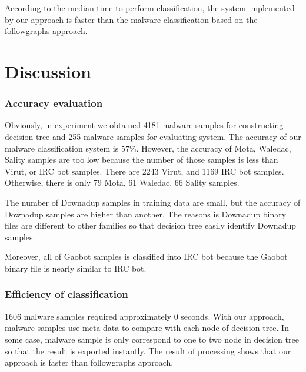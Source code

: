 According to the median time to perform classification, the system implemented by our approach is faster than the malware classification based on the followgraphs approach.
\section{Discussion}
\subsubsection{Accuracy evaluation}
Obviously, in experiment we obtained 4181 malware samples for constructing decision tree and 255 malware samples for evaluating system. The accuracy of our malware classification system is 57\%. However, the accuracy of Mota, Waledac, Sality samples are too low because the number of those samples is less than Virut, or IRC bot samples. There are 2243 Virut, and 1169 IRC bot samples. Otherwise, there is only 79 Mota, 61 Waledac, 66 Sality samples.

The number of Downadup samples in training data are small, but the accuracy of Downadup samples are higher than another. The reasons is Downadup binary files are different to other families so that decision tree easily identify Downadup samples.  

Moreover, all of Gaobot samples is classified into IRC bot because the Gaobot binary file is nearly similar to IRC bot.

\subsubsection{Efficiency of classification}

1606 malware samples required approximately 0 seconds. With our approach, malware samples use meta-data to compare with each node of decision tree. In some case, malware sample is only correspond to one to two node in decision tree so that the result is exported instantly. 
The result of processing shows that our approach is faster than followgraphs approach. 

